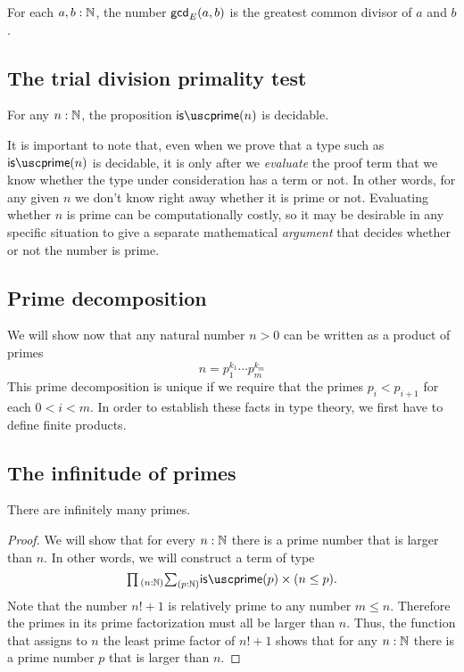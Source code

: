 \begin{prp}
  For each $a,b:{\mathbb{N}}$, the number $\mathsf{gcd}_E(a,b)$ is the greatest common divisor of $a$ and $b$.
\end{prp}

\subsection{The trial division primality test}

\begin{thm}
  For any $n:{\mathbb{N}}$, the proposition $\isprime(n)$ is decidable.
\end{thm}

It is important to note that, even when we prove that a type such as $\isprime(n)$ is decidable, it is only after we \emph{evaluate} the proof term that we know whether the type under consideration has a term or not. In other words, for any given $n$ we don't know right away whether it is prime or not. Evaluating whether $n$ is prime can be computationally costly, so it may be desirable in any specific situation to give a separate mathematical \emph{argument} that decides whether or not the number is prime.

\subsection{Prime decomposition}

We will show now that any natural number $n>0$ can be written as a product of primes
\begin{equation*}
  n=p_1^{k_1}\cdots p_{m}^{k_m}
\end{equation*}
This prime decomposition is unique if we require that the primes $p_i<p_{i+1}$ for each $0<i<m$. In order to establish these facts in type theory, we first have to define finite products.

\subsection{The infinitude of primes}

\begin{thm}
  There are infinitely many primes.
\end{thm}

\begin{proof}
  We will show that for every $n:{\mathbb{N}}$ there is a prime number that is larger than $n$. In other words, we will construct a term of type
  \begin{equation*}
    \prd{n:\N}\sm{p:\N}\isprime(p)\times (n\leq p).
  \end{equation*}
  Note that the number $n!+1$ is relatively prime to any number $m\leq n$. Therefore the primes in its prime factorization must all be larger than $n$. Thus, the function that assigns to $n$ the least prime factor of $n!+1$ shows that for any $n:{\mathbb{N}}$ there is a prime number $p$ that is larger than $n$.
\end{proof}

